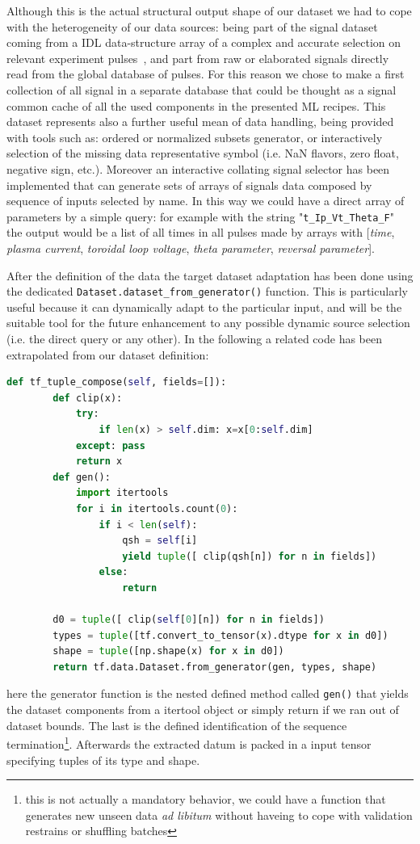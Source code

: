Although this is the actual structural output shape of our dataset we had to cope with the heterogeneity of our data sources: being part of the signal dataset coming from a \ac{IDL} data-structure array of a complex and accurate selection on relevant experiment pulses~\cite{Gobbin_QSH}, and part from raw or elaborated signals directly read from the global \MDSplus database of pulses.
For this reason we chose to make a first collection of all signal in a separate database that could be thought as a signal common cache of all the used components in the presented ML recipes.
This dataset represents also a further useful mean of data handling, being provided with tools such as: ordered or normalized subsets generator, or interactively selection of the missing data representative symbol (i.e. NaN flavors, zero float, negative sign, etc.).
Moreover an interactive collating signal selector has been implemented that can generate sets of arrays of signals data composed by sequence of inputs selected by name. In this way we could have a direct array of parameters by a simple query: for example with the string "\texttt{t\_Ip\_Vt\_Theta\_F}" the output would be a list of all times in all pulses made by arrays with [\textit{time}, \textit{plasma current}, \textit{toroidal loop voltage}, \textit{theta parameter}, \textit{reversal parameter}].

After the definition of the data the target \TF dataset adaptation has been done using the dedicated \TF \verb|Dataset.dataset_from_generator()| function. This is particularly useful because it can dynamically adapt to the particular input, and will be the suitable tool for the future enhancement to any possible dynamic source selection (i.e. the direct \MDSplus query or any other).
In the following a related code has been extrapolated from our dataset definition:
%
\begin{lstlisting}[language=Python, caption=Dataset from generator]
    def tf_tuple_compose(self, fields=[]):
        def clip(x):
            try: 
                if len(x) > self.dim: x=x[0:self.dim]
            except: pass
            return x
        def gen():
            import itertools
            for i in itertools.count(0):
                if i < len(self):
                    qsh = self[i]
                    yield tuple([ clip(qsh[n]) for n in fields])
                else:
                    return

        d0 = tuple([ clip(self[0][n]) for n in fields])
        types = tuple([tf.convert_to_tensor(x).dtype for x in d0])
        shape = tuple([np.shape(x) for x in d0])
        return tf.data.Dataset.from_generator(gen, types, shape)
\end{lstlisting}
%
here the generator function is the nested defined method called \verb|gen()| that yields the dataset components from a itertool object or simply return if we ran out of dataset bounds. The last is the defined identification of the sequence termination\footnote{this is not actually a mandatory behavior, we could have a function that generates new unseen data \textit{ad libitum} without haveing to cope with validation restrains or shuffling batches}.
Afterwards the extracted datum is packed in a \TF input tensor specifying tuples of its type and shape.

